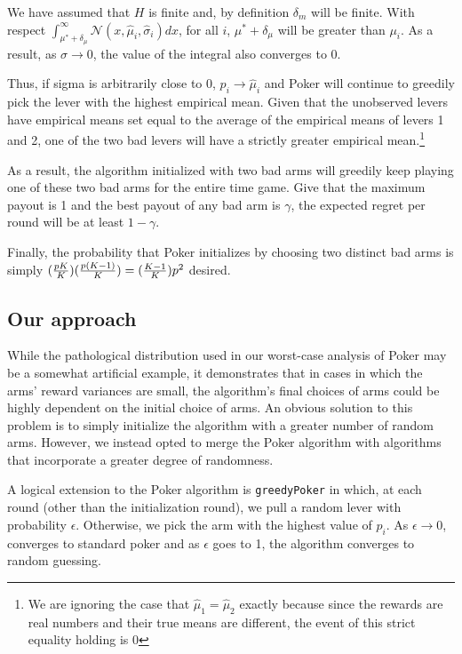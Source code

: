 \documentclass[12pt]{article}
\begin{document}
We have assumed that $H$ is finite and, by definition $\delta_{m}$ will be finite. With respect $\int_{\mu^{*}+\delta_{\mu}}^{\infty}\mathcal{N}(x,\hat{\mu}_{i}, \hat{\sigma}_{i})dx$, for all $i$, $\mu^{*}+\delta_{\mu}$ will be greater than $\mu_{i}$. As a result, as $\sigma \to 0$, the value of the integral also converges to 0.

Thus, if sigma is arbitrarily close to $0$, $p_{i} \rightarrow \hat{\mu}_{i}$ and Poker will continue to greedily pick the lever with the highest empirical mean. Given that the unobserved levers have empirical means set equal to the average of the empirical means of levers 1 and 2, one of the two bad levers will have a strictly greater empirical mean.\footnote{We are ignoring the case that $\hat{\mu}_{1} = \hat{\mu}_{2}$ exactly because since the rewards are real numbers and their true means are different, the event of this strict equality holding is 0}

As a result, the algorithm initialized with two bad arms will greedily keep playing one of these two bad arms for the entire time game. Give that the maximum payout is 1 and the best payout of any bad arm is $\gamma$, the expected regret per round will be at least $1-\gamma$. 

Finally, the probability that Poker initializes by choosing two distinct bad arms is simply $({pK\over{K}})({p(K-1)\over{K}}) = ({K-1\over K})p^{2}$ desired.

\subsection{Our approach}

While the pathological distribution used in our worst-case analysis of Poker may be a somewhat artificial example, it demonstrates that in cases in which the arms' reward variances are small, the algorithm's final choices of arms could be highly dependent  on the initial choice of arms. An obvious solution to this problem is to simply initialize the algorithm with a greater number of random arms. However, we instead opted to merge the Poker algorithm with algorithms that incorporate a greater degree of randomness.

A logical extension to the Poker algorithm is \texttt{greedyPoker} in which, at each round (other than the initialization round), we pull a random lever with probability $\epsilon$. Otherwise, we pick the arm with the highest value of $p_{i}$. As $\epsilon \to 0$,  converges to standard poker and as $\epsilon$ goes to 1, the algorithm converges to random guessing.
\end{document}
